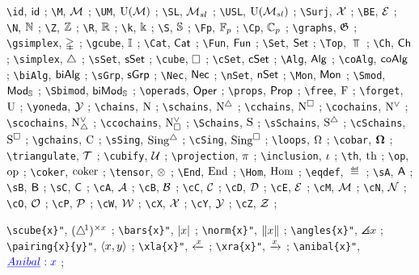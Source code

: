 \verb|\id|, $\id$ ;
\verb|\M|, $\M$ ;
\verb|\UM|, $\UM$ ;
\verb|\SL|, $\SL$ ;
\verb|\USL|, $\USL$ ;
\verb|\Surj|, $\Surj$ ;
\verb|\BE|, $\BE$ ;
\verb|\N|, $\N$ ;
\verb|\Z|, $\Z$ ;
\verb|\R|, $\R$ ;
\verb|\k|, $\k$ ;
\verb|\S|, $\S$ ;
\verb|\Fp|, $\Fp$ ;
\verb|\Cp|, $\Cp$ ;
\verb|\graphs|, $\graphs$ ;
\verb|\gsimplex|, $\gsimplex$ ;
\verb|\gcube|, $\gcube$ ;
\verb|\Cat|, $\Cat$ ;
\verb|\Fun|, $\Fun$ ;
\verb|\Set|, $\Set$ ;
\verb|\Top|, $\Top$ ;
\verb|\Ch|, $\Ch$ ;
\verb|\simplex|, $\simplex$ ;
\verb|\sSet|, $\sSet$ ;
\verb|\cube|, $\cube$ ;
\verb|\cSet|, $\cSet$ ;
\verb|\Alg|, $\Alg$ ;
\verb|\coAlg|, $\coAlg$ ;
\verb|\biAlg|, $\biAlg$ ;
\verb|\sGrp|, $\sGrp$ ;
\verb|\Nec|, $\Nec$ ;
\verb|\nSet|, $\nSet$ ;
\verb|\Mon|, $\Mon$ ;
\verb|\Smod|, $\Smod$ ;
\verb|\Sbimod|, $\Sbimod$ ;
\verb|\operads|, $\operads$ ;
\verb|\props|, $\props$ ;
\verb|\free|, $\free$ ;
\verb|\forget|, $\forget$ ;
\verb|\yoneda|, $\yoneda$ ;
\verb|\chains|, $\chains$ ;
\verb|\schains|, $\schains$ ;
\verb|\cchains|, $\cchains$ ;
\verb|\cochains|, $\cochains$ ;
\verb|\scochains|, $\scochains$ ;
\verb|\ccochains|, $\ccochains$ ;
\verb|\Schains|, $\Schains$ ;
\verb|\sSchains|, $\sSchains$ ;
\verb|\cSchains|, $\cSchains$ ;
\verb|\gchains|, $\gchains$ ;
\verb|\sSing|, $\sSing$ ;
\verb|\cSing|, $\cSing$ ;
\verb|\loops|, $\loops$ ;
\verb|\cobar|, $\cobar$ ;
\verb|\triangulate|, $\triangulate$ ;
\verb|\cubify|, $\cubify$ ;
\verb|\projection|, $\projection$ ;
\verb|\inclusion|, $\inclusion$ ;
\verb|\th|, $\th$ ;
\verb|\op|, $\op$ ;
\verb|\coker|, $\coker$ ;
\verb|\tensor|, $\tensor$ ;
\verb|\End|, $\End$ ;
\verb|\Hom|, $\Hom$ ;
\verb|\eqdef|, $\eqdef$ ;
\verb|\sA|, $\sA$ ;
\verb|\sB|, $\sB$ ;
\verb|\sC|, $\sC$ ;
\verb|\cA|, $\cA$ ;
\verb|\cB|, $\cB$ ;
\verb|\cC|, $\cC$ ;
\verb|\cD|, $\cD$ ;
\verb|\cE|, $\cE$ ;
\verb|\cM|, $\cM$ ;
\verb|\cN|, $\cN$ ;
\verb|\cO|, $\cO$ ;
\verb|\cP|, $\cP$ ;
\verb|\cW|, $\cW$ ;
\verb|\cX|, $\cX$ ;
\verb|\cY|, $\cY$ ;
\verb|\cZ|, $\cZ$ ;


\verb|\scube{x}"|, $\scube{x}$ ;
\verb|\bars{x}"|, $\bars{x}$ ;
\verb|\norm{x}"|, $\norm{x}$ ;
\verb|\angles{x}"|, $\angles{x}$ ;
\verb|\pairing{x}{y}"|, $\pairing{x}{y}$ ;
\verb|\xla{x}"|, $\xla{x}$ ;
\verb|\xra{x}"|, $\xra{x}$ ;
\verb|\anibal{x}"|, $\anibal{x}$ ;